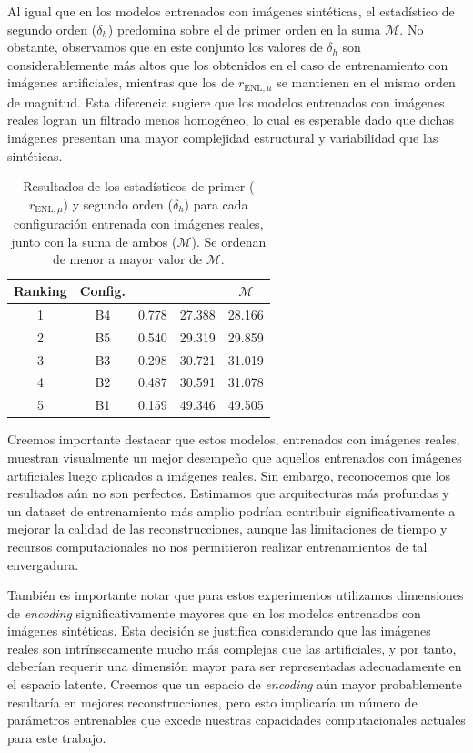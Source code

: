 Al igual que en los modelos entrenados con imágenes sintéticas, el estadístico de segundo orden ($\delta_h$) predomina sobre el de primer orden en la suma $\mathcal{M}$. No obstante, observamos que en este conjunto los valores de $\delta_h$ son considerablemente más altos que los obtenidos en el caso de entrenamiento con imágenes artificiales, mientras que los de $r_{\text{ENL},\mu}$ se mantienen en el mismo orden de magnitud. Esta diferencia sugiere que los modelos entrenados con imágenes reales logran un filtrado menos homogéneo, lo cual es esperable dado que dichas imágenes presentan una mayor complejidad estructural y variabilidad que las sintéticas.

\begin{table}[htbp]
	\hspace{0.2cm}
	\centering
	\caption{Resultados de los estadísticos de primer ($r_{\text{ENL},\mu}$) y segundo orden ($\delta_h$) para cada configuración entrenada con imágenes reales, junto con la suma de ambos ($\mathcal{M}$). Se ordenan de menor a mayor valor de $\mathcal{M}$.\newline}
	\label{tab:statistics_results_imreales}
	\small
	\begin{tabular}{|c|c|c|c|c|}
		\hline
		\textbf{Ranking} &
		\textbf{Config.} &
		\makecell{$r_{\text{ENL},\mu}$} &
		\makecell{$\delta_h$} &
		$\mathcal{M}$ \\
		\hline
		1 & B4 & 0.778 & 27.388 & 28.166 \\
		2 & B5 & 0.540 & 29.319 & 29.859 \\
		3 & B3 & 0.298 & 30.721 & 31.019 \\
		4 & B2 & 0.487 & 30.591 & 31.078 \\
		5 & B1 & 0.159 & 49.346 & 49.505 \\
		\hline
	\end{tabular}
	\vspace{0.5cm}
\end{table}


Creemos importante destacar que estos modelos, entrenados con imágenes reales, muestran visualmente un mejor desempeño que aquellos entrenados con imágenes artificiales luego aplicados a imágenes reales. Sin embargo, reconocemos que los resultados aún no son perfectos. Estimamos que arquitecturas más profundas y un dataset de entrenamiento más amplio podrían contribuir significativamente a mejorar la calidad de las reconstrucciones, aunque las limitaciones de tiempo y recursos computacionales no nos permitieron realizar entrenamientos de tal envergadura.

También es importante notar que para estos experimentos utilizamos dimensiones de \emph{encoding} significativamente mayores que en los modelos entrenados con imágenes sintéticas. Esta decisión se justifica considerando que las imágenes reales son intrínsecamente mucho más complejas que las artificiales, y por tanto, deberían requerir una dimensión mayor para ser representadas adecuadamente en el espacio latente. Creemos que un espacio de \emph{encoding} aún mayor probablemente resultaría en mejores reconstrucciones, pero esto implicaría un número de parámetros entrenables que excede nuestras capacidades computacionales actuales para este trabajo.
